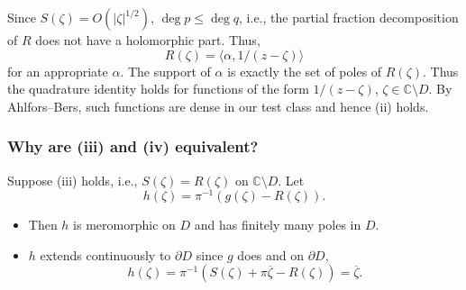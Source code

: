 \documentclass{beamer}
\begin{document}

\begin{frame}

Since $S(\zeta) = O(\vert \zeta \vert^{1/2})$, $\deg p \le \deg q$, i.e., the partial fraction decomposition of $R$ does not have a holomorphic 
part. Thus, 
\[
R(\zeta) = \langle \alpha, 1/(z - \zeta) \rangle
\]
for an appropriate $\alpha$. The support of $\alpha$ is exactly the set of poles of $R(\zeta)$. Thus the quadrature identity holds for functions of the form $1/(z - \zeta)$, $\zeta \in 
\mathbb C \setminus D$. By Ahlfors--Bers, such functions are dense in our test class and hence (ii) holds.

\end{frame}


\begin{frame}
 \frametitle{Why are (iii) and (iv) equivalent?}

Suppose (iii) holds, i.e., $S(\zeta) = R(\zeta)$ on $\mathbb C \setminus D$. Let
\[
h(\zeta) = \pi^{-1}(g(\zeta) - R(\zeta)). 
\]

\begin{itemize}

\item Then $h$ is meromorphic on $D$ and has finitely many poles in $D$.

\item $h$ extends continuously to $\partial D$ since $g$ does and on $\partial D$,
\[
h(\zeta) = \pi^{-1}(S(\zeta) + \pi \overline \zeta - R(\zeta)) = \overline \zeta.
\]

\end{itemize}

\end{frame}

\end{document}
